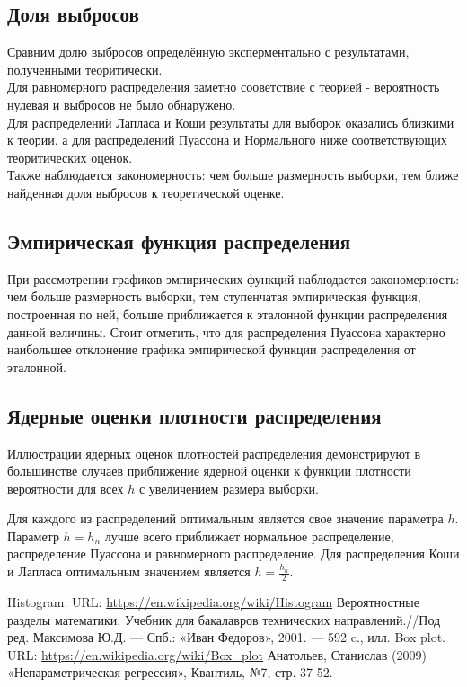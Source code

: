 \documentclass[a4paper,14pt]{article}
\begin{document}
	\subsection{Доля выбросов}
	Сравним долю выбросов определённую эксперментально с результатами, полученными теоритически.\\
	Для равномерного распределения заметно сооветствие с теорией - вероятность нулевая и выбросов не было обнаружено.\\
	Для распределений Лапласа и Коши результаты для выборок оказались близкими к теории, а для распределений Пуассона и Нормального ниже соответствующих теоритических оценок.\\
	Также наблюдается закономерность: чем больше размерность выборки, тем ближе найденная доля выбросов к теоретической оценке.
	
	\subsection{Эмпирическая функция распределения}
	При рассмотрении графиков эмпирических функций наблюдается закономерность: чем больше размерность выборки, тем ступенчатая эмпирическая функция, построенная по ней, больше приближается к эталонной функции распределения данной величины. Стоит отметить, что для распределения Пуассона характерно наибольшее отклонение графика эмпирической функции распределения от эталонной.
	\subsection{Ядерные оценки плотности распределения}
	Иллюстрации ядерных оценок плотностей распределения демонстрируют в большинстве случаев приближение ядерной оценки к функции плотности вероятности для всех $h$ с увеличением размера выборки. 
	
	Для каждого из распределений оптимальным является свое значение параметра $h$. Параметр $h=h_n$ лучше всего приближает нормальное распределение, распределение Пуассона и равномерного распределение. Для распределения Коши и Лапласа оптимальным значением является $h=\frac{h_n}{2}$.
	

	\newpage
	
	\begin{thebibliography}{4}
		Histogram. URL: \url{https://en.wikipedia.org/wiki/Histogram}
		Вероятностные разделы математики. Учебник для бакалавров технических направлений.//Под ред. Максимова Ю.Д. --- Спб.: «Иван Федоров», 2001. --- 592 c., илл.
		Box plot. URL: \url{https://en.wikipedia.org/wiki/Box_plot}
		Анатольев, Станислав (2009) «Непараметрическая регрессия», Квантиль, №7, стр. 37-52.
	\end{thebibliography}
\end{document}
